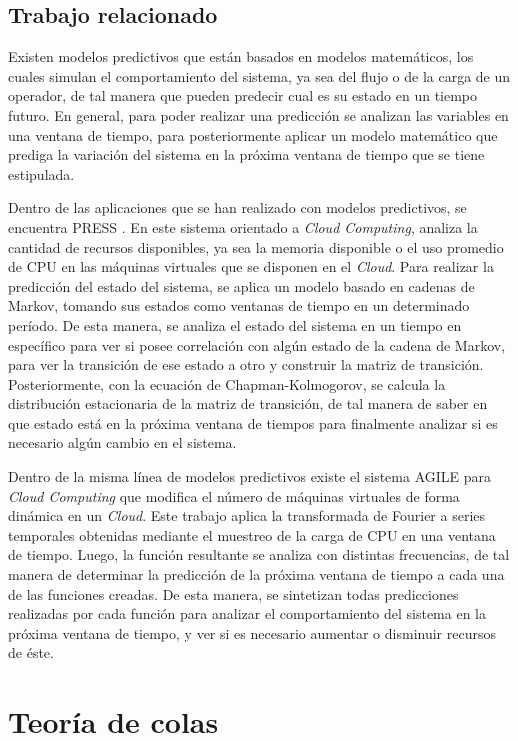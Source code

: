 \subsection{Trabajo relacionado}
\label{subSec:markovTrabajo}
Existen modelos predictivos que están basados en modelos matemáticos, los cuales simulan el comportamiento del sistema, ya sea del flujo o de la carga de un operador, de tal manera que pueden predecir cual es su estado en un tiempo futuro. En general, para poder realizar una predicción se analizan las variables en una ventana de tiempo, para posteriormente aplicar un modelo matemático que prediga la variación del sistema en la próxima ventana de tiempo que se tiene estipulada.

Dentro de las aplicaciones que se han realizado con modelos predictivos, se encuentra PRESS \citep{GongGW10}. En este sistema orientado a \textit{Cloud Computing}, analiza la cantidad de recursos disponibles, ya sea la memoria disponible o el uso promedio de CPU en las máquinas virtuales que se disponen en el \textit{Cloud}. Para realizar la predicción del estado del sistema, se aplica un modelo basado en cadenas de Markov, tomando sus estados como ventanas de tiempo en un determinado período. De esta manera, se analiza el estado del sistema en un tiempo en específico para ver si posee correlación con algún estado de la cadena de Markov, para ver la transición de ese estado a otro y construir la matriz de transición. Posteriormente, con la ecuación de Chapman-Kolmogorov, se calcula la distribución estacionaria de la matriz de transición, de tal manera de saber en que estado está en la próxima ventana de tiempos para finalmente analizar si es necesario algún cambio en el sistema.

Dentro de la misma línea de modelos predictivos existe el sistema AGILE \citep{NguyenSGSW13} para \textit{Cloud Computing} que modifica el número de máquinas virtuales de forma dinámica en un \textit{Cloud}. Este trabajo aplica la transformada de Fourier \citep{falk2012first} a series temporales obtenidas mediante el muestreo de la carga de CPU en una ventana de tiempo. Luego, la función resultante se analiza con distintas frecuencias, de tal manera de determinar la predicción de la próxima ventana de tiempo a cada una de las funciones creadas. De esta manera, se sintetizan todas predicciones realizadas por cada función para analizar el comportamiento del sistema en la próxima ventana de tiempo, y ver si es necesario aumentar o disminuir recursos de éste.

\section{Teoría de colas}
\label{sec:teoriaColas}

